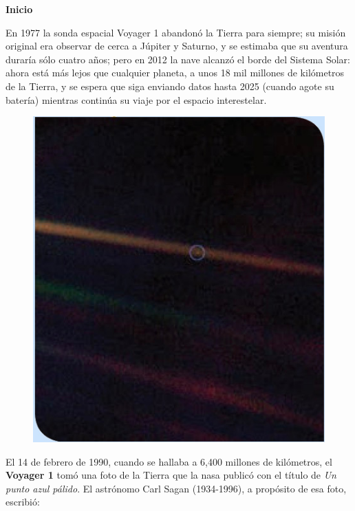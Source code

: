 \documentclass[11pt]{book}
\begin{document}
\begin{boxK}
    \begin{center}\bfseries \color{colorrds} Inicio\end{center}
    En 1977 la sonda espacial Voyager 1 abandonó la Tierra para siempre; su misión original
    era observar de cerca a Júpiter y Saturno, y se estimaba que su aventura duraría sólo
    cuatro años; pero en 2012 la nave alcanzó el borde del Sistema Solar: ahora está más
    lejos que cualquier planeta, a unos 18 mil millones de kilómetros de la Tierra,
    y se espera que siga enviando datos hasta 2025 (cuando agote su batería) mientras
    continúa su viaje por el espacio interestelar.\\

    \begin{figure}
        \centering
        \includegraphics[width=\linewidth]{tierra.jpg}
        \label{fig:tierra}
    \end{figure}

    El 14 de febrero de 1990, cuando se hallaba a 6,400 millones de kilómetros,
    el \textbf{Voyager 1} tomó una foto de la Tierra que la nasa publicó con el
    t\'itulo de \emph{Un punto azul pálido}. El astrónomo Carl Sagan (1934-1996), a propósito de esa foto, escribió:


\end{boxK}
\end{document}
